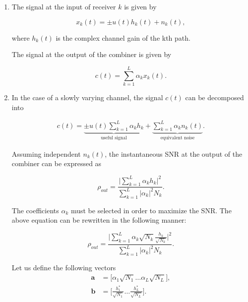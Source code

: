 \documentclass [a4paper, 11pt] {article}
\begin{document}
    \begin{solution}


        \begin{enumerate}
    \item The signal at the input of receiver $k$ is given by

    \begin{equation}
        x_k(t) = \pm u(t) h_k(t) + n_k(t),
    \end{equation}

    where $h_k(t)$ is the complex channel gain of the kth path.

    The signal at the output of the combiner is given by

    \begin{equation}
        c(t) = \sum_{k=1}^{L} \alpha_k x_k(t).
    \end{equation}

    \item In the case of a slowly varying channel, the signal $c(t)$ can be decomposed into

    \begin{align}
        c(t) = \underbrace{\pm u(t) \sum_{k=1}^{L}\alpha_kh_k}_{\text{useful signal}} + \underbrace{\sum_{k=1}^{L}\alpha_k n_k(t)}_{\text{equivalent noise}}.
    \end{align}

    Assuming independent $n_k(t)$, the instantaneous SNR at the output of the combiner can be expressed as

    \begin{equation}
        \rho_{out} = \dfrac{\Big| \sum_{k=1}^{L}\alpha_kh_k \Big|^2}{\sum_{k=1}^{L} |\alpha_k|^2N_k}.
    \end{equation}

    The coefficients $\alpha_k$ must be selected in order to maximize the SNR. The above equation can be rewritten in the following manner:

        \begin{equation}
        \rho_{out} = \dfrac{\Big| \sum_{k=1}^{L}\alpha_k\sqrt{N_k} \frac{h_k}{\sqrt{N_k}} \Big|^2}{\sum_{k=1}^{L} |\alpha_k|^2N_k}.
        \end{equation}

    Let us define the following vectors
    \begin{align}
        \mathbf{a} &= \Big[\alpha_1\sqrt{N_1} \hdots \alpha_L\sqrt{N_L}\Big], \\
        \mathbf{b} &= \bigg[\frac{h^*_1}{\sqrt{N_1}} \hdots \frac{h^*_L}{\sqrt{N_L}}\bigg].
    \end{align}


\end{enumerate}
\end{solution}
\end{document}
